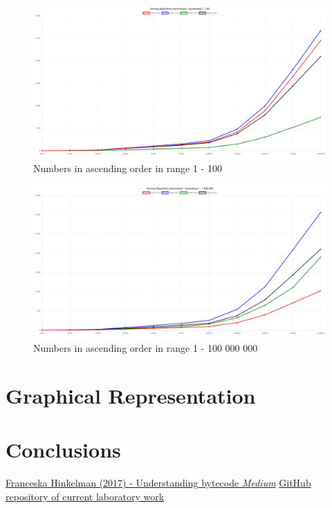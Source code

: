\documentclass[12pt]{article}
\begin{document}
\begin{figure}[h]
    \centering
    \includegraphics[width=1\textwidth]{ascen100.png}
    \caption{Numbers in ascending order in range 1 - 100}
    \label{fig:ascending100}
\end{figure}

\begin{figure}[h]
    \centering
    \includegraphics[width=1\textwidth]{ascen1000000.png}
    \caption{Numbers in ascending order in range 1 - 100 000 000}
    \label{fig:ascending1000000}
\end{figure}




\clearpage
\section*{Graphical Representation}
\hspace{0.8cm}

\clearpage
\section*{Conclusions}
\hspace{0.6cm} 

\begin{thebibliography}{9}

   \href{https://medium.com/dailyjs/understanding-v8s-bytecode-317d46c94775}{Franceska
      Hinkelman (2017) - Understanding bytecode \emph{Medium}}
       \href{https://github.com/DdimaPos/AA-labs/tree/main/Lab2}{GitHub repository of current laboratory work}
\end{thebibliography}
\end{document}
